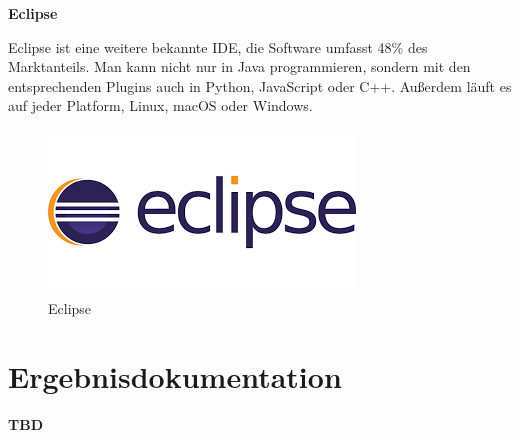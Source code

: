 \cite{IntelliJ}

\textbf{Eclipse}

Eclipse ist eine weitere bekannte IDE, die Software umfasst 48\% des Marktanteils. Man kann nicht nur in Java programmieren, sondern mit den entsprechenden Plugins auch in Python, JavaScript oder C++. Außerdem läuft es auf jeder Platform, Linux, macOS oder Windows.

\begin{figure}[H]
	\centering
	\includegraphics[width=0.5\linewidth]{images/eclipse.png}
	\caption[Eclipse]{Eclipse}
	\label{fig:Eclipse}
\end{figure}


\cite{Eclipse}









\chapter{Ergebnisdokumentation}
\textbf{TBD}


